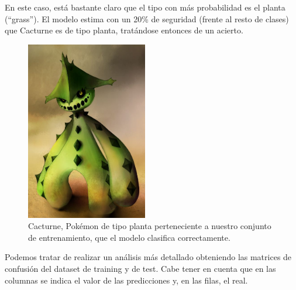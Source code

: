 \documentclass[
  12pt,
]{extreport}
\begin{document}
En este caso, está bastante claro que el tipo con más probabilidad es el
planta (``grass''). El modelo estima con un 20\% de seguridad (frente al
resto de clases) que Cacturne es de tipo planta, tratándose entonces de
un acierto.

\begin{figure}[H]

{\centering \includegraphics[width=2.08333in,height=\textheight]{trabajo_images/cacturne.jpg}

}

\caption{Cacturne, Pokémon de tipo planta perteneciente a nuestro
conjunto de entrenamiento, que el modelo clasifica correctamente.}

\end{figure}%

Podemos tratar de realizar un análisis más detallado obteniendo las
matrices de confusión del dataset de training y de test. Cabe tener en
cuenta que en las columnas se indica el valor de las predicciones y, en
las filas, el real.
\end{document}
